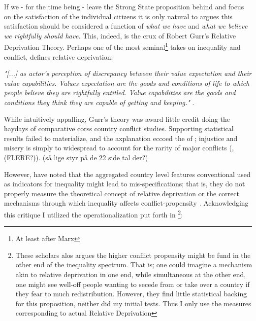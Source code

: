 \documentclass[a4paper]{article}
\begin{document}
If we - for the time being - leave the Strong State proposition behind and focus on the satisfaction of the individual citizens it is only natural to argues this satisfaction should be considered a function of \emph{what we have} and \emph{what we believe we rightfully should have}. This, indeed, is the crux of Robert Gurr's \citeyearpar{Gurr_1970} Relative Deprivation Theory. Perhaps one of the most seminal\footnote{At least after Marx} takes on inequality and conflict, \cite{Gurr_1970} defines relative deprivation: 

\begin{displayquote}
\emph{"[...] as actor's perception of discrepancy between their value expectation and their value capabilities. Values expectation are the goods and conditions of life to which people believe they are rightfully entitled. Value capabilities are the goods and conditions they think they are capable of getting and keeping."} \citep[24]{Gurr_1970}. 
\end{displayquote}

While intuitively appalling, Gurr's theory was award little credit doing the haydays of comparative corss country conflict studies. Supporting statistical results failed to materialize, and the axplanation eccoed the of \cite[11]{Skocpol_1979}; injustice and misery is simply to widespread to account for the rarity of major conflicts (\citealp[p. 22]{Collier_Hoeffler_1998},  \citealp[p. 22]{Collier_Hoeffler_2004} \citealp[p. 44]{Fearon_Laitin_2003}(FLERE?)). (så lige styr på de 22 side tal der?)


However, \cite{Cederman_Gleditsch_2009,Cederman_Gleditsch_Buhaug_2013} have noted that the aggregated country level features conventional used as indicators for inequality might lead to mis-specifications; that is, they do not properly measure the theoretical concept of relative deprivation or the correct mechanisms through which inequality affects conflict-propensity \citep[XX]{Cederman_Gleditsch_Buhaug_2013}. Acknowledging this critique I utilized the operationalization put forth in \cite[p. 104-105]{Cederman_Gleditsch_Buhaug_2013}\footnote{These scholars alos argues the higher conflict propensity might be fund in the other end of the inequality spectrum. That is; one could imagine a mechanism akin to relative deprivation in one end, while simultaneous at the other end, one might see well-off people wanting to secede from or take over a country if they fear to much redistribution. However, they find little statistical backing for this proposition, neither did my initial tests. Thus I only use the measures corresponding to actual Relative Deprivation}:\par
\end{document}
